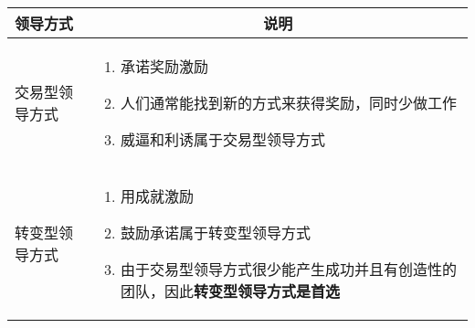 \vspace{-0.5em}
\begin{spacing}{1.2}
    \centering
    \begin{longtable}{|m{1.5cm}<{\centering}|m{13.8cm}|}
        \hline
        \textbf{领导方式} & \multicolumn{1}{c|}{\textbf{说明}} \\ \hline
        交易型领导方式 &
        \vspace{-1.1em}
        \begin{enumerate}[label=\arabic*.,leftmargin=1.2em,itemsep=-2pt]
            \item 承诺奖励激励
            \item 人们通常能找到新的方式来获得奖励，同时少做工作
            \item 威逼和利诱属于交易型领导方式
        \vspace{-1.3em}
        \end{enumerate} \\ \hline
        转变型领导方式 &
        \vspace{-1.1em}
        \begin{enumerate}[label=\arabic*.,leftmargin=1.2em,itemsep=-2pt]
            \item 用成就激励
            \item 鼓励承诺属于转变型领导方式
            \item 由于交易型领导方式很少能产生成功并且有创造性的团队，因此\textbf{转变型领导方式是首选}
        \vspace{-2.5em}
        \end{enumerate} \\ \hline
    \end{longtable}
\end{spacing}
\vspace{-5em}
